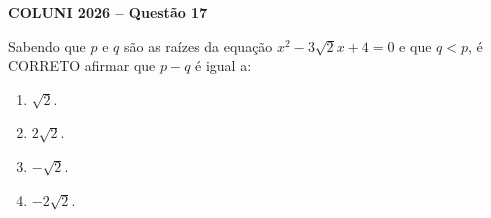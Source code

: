 \textbf{COLUNI 2026 -- Questão 17}\par\medskip Sabendo que $p$ e $q$ são as raízes da equação $x^2-3\sqrt{2}x+4=0$ e que $q<p$, é CORRETO afirmar que $p-q$ é igual a:
\begin{enumerate}
\item $\sqrt{2}$.
\item $2\sqrt{2}$.
\item $-\sqrt{2}$.
\item $-2\sqrt{2}$.
\end{enumerate}
